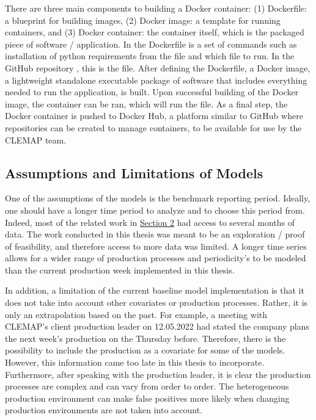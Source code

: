 There are three main components to building a Docker container: (1) Dockerfile: a blueprint for building images, (2) Docker image: a template for running containers, and (3) Docker container: the container itself, which is the packaged piece of software / application. In the Dockerfile is a set of commands such as installation of python requirements from the  file and which file to run. In the GitHub repository \cite{Stechschulte_Gaussian_Processes_for_2022}, this is the  file. After defining the Dockerfile, a Docker image, a lightweight standalone executable package of software that includes everything needed to run the application, is built. Upon successful building of the Docker image, the container can be ran, which will run the  file. As a final step, the Docker container is pushed to Docker Hub, a platform similar to GitHub where repositories can be created to manage containers, to be available for use by the CLEMAP team. 

\subsection{Assumptions and Limitations of Models}

One of the assumptions of the models is the benchmark reporting period. Ideally, one should have a longer time period to analyze and to choose this period from. Indeed, most of the related work in \hyperlink{section.2}{Section 2} had access to several months of data. The work conducted in this thesis was meant to be an exploration / proof of feasibility, and therefore access to more data was limited. A longer time series allows for a wider range of production processes and periodicity's to be modeled than the current production week implemented in this thesis.

In addition, a limitation of the current baseline model implementation is that it does not take into account other covariates or production processes. Rather, it is only an extrapolation based on the past. For example, a meeting with CLEMAP's client production leader on 12.05.2022 had stated the company plans the next week's production on the Thursday before. Therefore, there is the possibility to include the production as a covariate for some of the models. However, this information came too late in this thesis to incorporate. Furthermore, after speaking with the production leader, it is clear the production processes are complex and can vary from order to order. The heterogeneous production environment can make false positives more likely when changing production environments are not taken into account.